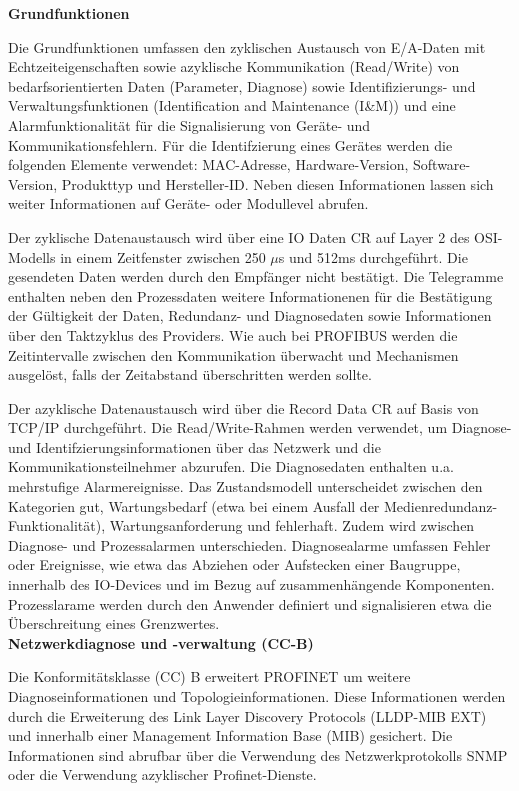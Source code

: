 \textbf{Grundfunktionen}


Die Grundfunktionen umfassen den zyklischen Austausch von E/A-Daten mit Echtzeiteigenschaften sowie azyklische Kommunikation (Read/Write) von bedarfsorientierten Daten (Parameter, Diagnose) sowie Identifizierungs- und Verwaltungsfunktionen (Identification and Maintenance (I\&M)) und eine Alarmfunktionalität für die Signalisierung von Geräte- und Kommunikationsfehlern. Für die Identifzierung eines Gerätes werden die folgenden Elemente verwendet: MAC-Adresse, Hardware-Version, Software-Version, Produkttyp und Hersteller-ID. Neben diesen Informationen lassen sich weiter Informationen auf Geräte- oder Modullevel abrufen\citep{PROFINET2}.


Der zyklische Datenaustausch wird über eine IO Daten CR auf Layer 2 des OSI-Modells in einem Zeitfenster zwischen 250 $\mu $s und 512ms durchgeführt. Die gesendeten Daten werden durch den Empfänger nicht bestätigt. Die Telegramme enthalten neben den Prozessdaten weitere Informationenen für die Bestätigung der Gültigkeit der Daten, Redundanz- und Diagnosedaten sowie Informationen über den Taktzyklus des Providers. Wie auch bei PROFIBUS werden die Zeitintervalle zwischen den Kommunikation überwacht und Mechanismen ausgelöst, falls der Zeitabstand überschritten werden sollte. 

Der azyklische Datenaustausch wird über die Record Data CR auf Basis von TCP/IP durchgeführt. Die Read/Write-Rahmen werden verwendet, um Diagnose- und Identifzierungsinformationen über das Netzwerk und die Kommunikationsteilnehmer abzurufen. Die Diagnosedaten enthalten u.a. mehrstufige Alarmereignisse. Das Zustandsmodell unterscheidet zwischen den Kategorien \glqq gut\grqq , \glqq Wartungsbedarf (etwa bei einem Ausfall der Medienredundanz-Funktionalität)\grqq , \glqq Wartungsanforderung\grqq{} und \glqq fehlerhaft\grqq . Zudem wird zwischen Diagnose- und Prozessalarmen unterschieden. Diagnosealarme umfassen Fehler oder Ereignisse, wie etwa das Abziehen oder Aufstecken einer Baugruppe, innerhalb des IO-Devices und im Bezug auf zusammenhängende Komponenten. Prozesslarame werden durch den Anwender definiert und signalisieren etwa die Überschreitung eines Grenzwertes. \\


\textbf{Netzwerkdiagnose und -verwaltung (CC-B)}


Die Konformitätsklasse (CC) B erweitert PROFINET um weitere Diagnoseinformationen und Topologieinformationen. Diese Informationen werden durch die Erweiterung des Link Layer Discovery Protocols (LLDP-MIB EXT) und innerhalb einer Management Information Base (MIB) gesichert. Die Informationen sind abrufbar über die Verwendung des Netzwerkprotokolls SNMP oder die Verwendung azyklischer Profinet-Dienste. 

